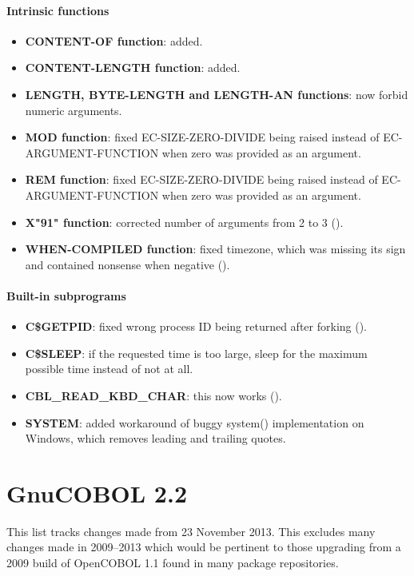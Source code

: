 \paragraph{Intrinsic functions}
\begin{itemize}
\item \textbf{CONTENT-OF function}: added.
\item \textbf{CONTENT-LENGTH function}: added.
\item \textbf{LENGTH, BYTE-LENGTH and LENGTH-AN functions}: now forbid numeric arguments.
\item \textbf{MOD function}: fixed EC-SIZE-ZERO-DIVIDE being raised instead of EC-ARGUMENT-FUNCTION when zero was provided as an argument.
\item \textbf{REM function}: fixed EC-SIZE-ZERO-DIVIDE being raised instead of EC-ARGUMENT-FUNCTION when zero was provided as an argument.
\item \textbf{X"91" function}: corrected number of arguments from 2 to 3 ().
\item \textbf{WHEN-COMPILED function}: fixed timezone, which was missing its sign and contained nonsense when negative ().
\end{itemize}

\paragraph{Built-in subprograms}
\begin{itemize}
\item \textbf{C\$GETPID}: fixed wrong process ID being returned after forking ().
\item \textbf{C\$SLEEP}: if the requested time is too large, sleep for the maximum possible time instead of not at all.
\item \textbf{CBL\_READ\_KBD\_CHAR}: this now works ().
\item \textbf{SYSTEM}: added workaround of buggy system() implementation on Windows, which removes leading and trailing quotes.
\end{itemize}

\section{GnuCOBOL 2.2}

This list tracks changes made from 23 November 2013. This excludes many changes made in 2009--2013 which would be pertinent to those upgrading from a 2009 build of OpenCOBOL 1.1 found in many package repositories.

